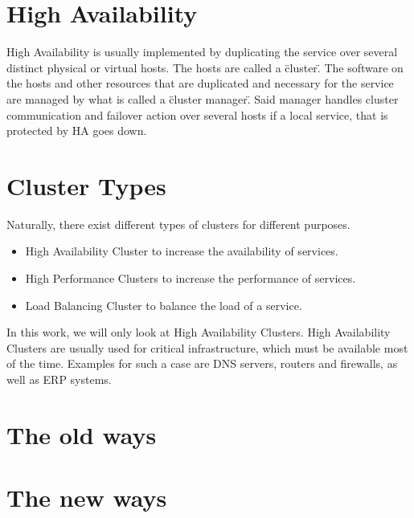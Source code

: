 \section{High Availability}


High Availability is usually implemented by duplicating the service over several distinct physical or
virtual hosts. The hosts are called a \"cluster\". The software on the hosts and other resources
that are duplicated and necessary for the service are managed by what is called a \"cluster manager\".
Said manager handles cluster communication and failover action over several hosts if a local service,
that is protected by \ac{HA} goes down.

\section{Cluster Types}

Naturally, there exist different types of clusters for different purposes.
\begin{itemize}
\item High Availability Cluster to increase the availability of services.
\item High Performance Clusters to increase the performance of services.
\item Load Balancing Cluster to balance the load of a service.
\end{itemize}

In this work, we will only look at High Availability Clusters.
High Availability Clusters are usually used for critical infrastructure,
which must be available most of the time. Examples for such a case are DNS servers,
routers and firewalls, as well as \ac{ERP} systems.

\section{The old ways}


\section{The new ways}
